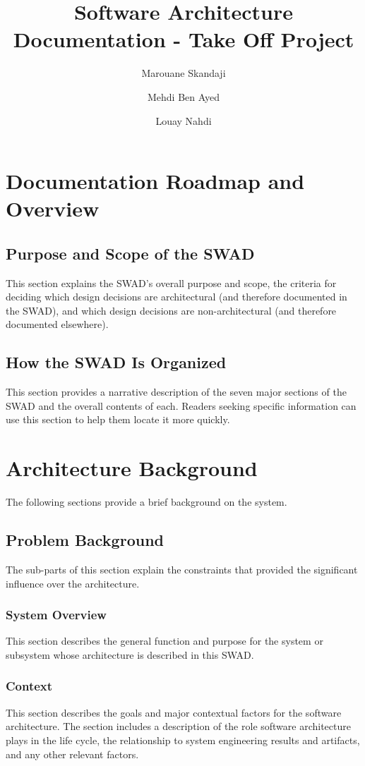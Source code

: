 \documentclass[a4paper,11pt]{book}
\title{Software Architecture Documentation - Take Off Project}
\author{Marouane Skandaji\and Mehdi Ben Ayed\and Louay Nahdi}
\begin{document}
\maketitle

\tableofcontents

\chapter{Documentation Roadmap and Overview}

\section{Purpose and Scope of the SWAD}
This section explains the SWAD’s overall purpose and scope, the criteria for deciding which design decisions are architectural (and therefore documented in the SWAD), and which design decisions are non-architectural (and therefore documented elsewhere).

\section{How the SWAD Is Organized}
This section provides a narrative description of the seven major sections of the SWAD and the overall contents of each. Readers seeking specific information can use this section to help them locate it more quickly.

\chapter{Architecture Background}
The following sections provide a brief background on the system.

\section{Problem Background}
The sub-parts of this section explain the constraints that provided the significant influence over the architecture.

\subsection{System Overview}
This section describes the general function and purpose for the system or subsystem whose architecture is described in this SWAD.

\subsection{Context}
This section describes the goals and major contextual factors for the software architecture. The section includes a description of the role software architecture plays in the life cycle, the relationship to system engineering results and artifacts, and any other relevant factors.
\end{document}
